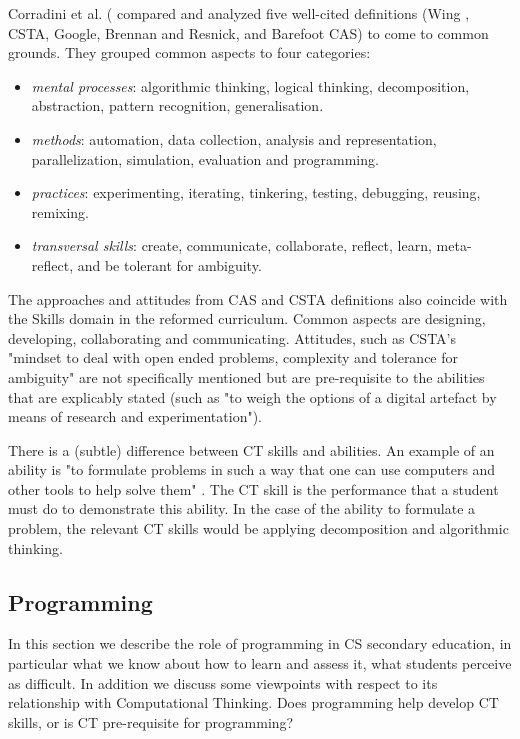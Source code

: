 Corradini et al. (\cite{corradini2017conceptions} compared and analyzed five well-cited definitions (Wing \cite{Wing2006}, CSTA\cite{CSTA2011CT}, Google\cite{Google2017CT}, Brennan and Resnick\cite{BrennanResnick2012}, and Barefoot CAS\cite{CAS2014CT}) to come to common grounds. They grouped common aspects to four categories:
\begin{itemize}
\item \emph{mental processes}: algorithmic thinking, logical thinking, decomposition, abstraction, pattern recognition, generalisation.
\item \emph{methods}: automation, data collection, analysis and representation, parallelization, simulation, evaluation and programming.
\item \emph{practices}: experimenting, iterating, tinkering, testing, debugging, reusing, remixing.
\item \emph{transversal skills}: create, communicate, collaborate, reflect, learn, meta-reflect, and be tolerant for ambiguity.
\end{itemize}

The approaches and attitudes from CAS and CSTA definitions also coincide with the Skills domain in the reformed curriculum. Common aspects are designing, developing, collaborating and communicating. Attitudes, such as CSTA's "mindset to deal with open ended problems, complexity and tolerance for ambiguity" are not specifically mentioned but are pre-requisite to the abilities that are explicably stated (such as "to weigh the options of a digital artefact by means of research and experimentation").



There is a (subtle) difference between CT skills and abilities. An example of an ability is "to formulate problems in such a way that one can use computers and other tools to help solve them" \cite{Barendsen2016}. The CT skill is the performance that a student must do to demonstrate this ability. In the case of the ability to formulate a problem, the relevant CT skills would be applying decomposition and algorithmic thinking.

\subsection{Programming}
In this section we describe the role of programming in CS secondary education, in particular what we know about how to learn and assess it, what students perceive as difficult. In addition we discuss some viewpoints with respect to its relationship with Computational Thinking. Does programming help develop CT skills, or is CT pre-requisite for programming?


